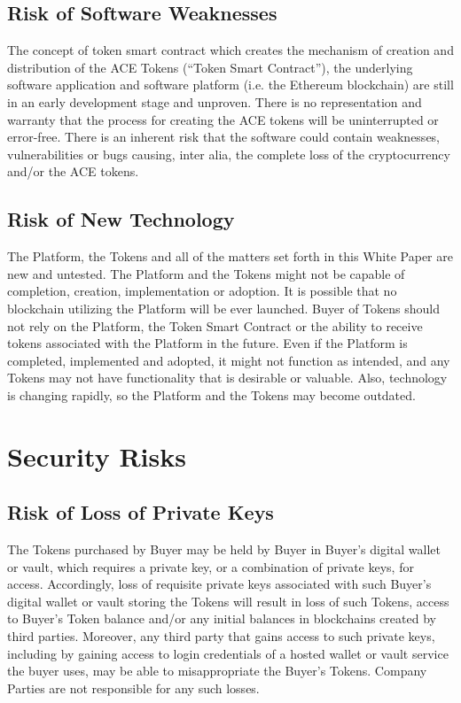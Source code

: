 \documentclass[12pt]{report}
\newcommand{\hlc}[1]{\colorbox{yellow!25}{#1}}
\begin{document}
\subsection*{\hlc{Risk of Software Weaknesses}}
\label{risks-block-weaknesses}
The concept of token smart contract which creates the mechanism of creation and distribution of the ACE Tokens (“Token Smart Contract”), the underlying software application and software platform (i.e. the Ethereum blockchain) are still in an early development stage and unproven. There is no representation and warranty that the process for creating the ACE tokens will be uninterrupted or error-free. There is an inherent risk that the software could contain weaknesses, vulnerabilities or bugs causing, inter alia, the complete loss of the cryptocurrency and/or the ACE
tokens.

\subsection*{Risk of New Technology}
The Platform, the Tokens and all of the matters set forth in this White Paper are new and untested. The Platform and the Tokens might not be capable of completion, creation, implementation or adoption. It is possible that no blockchain utilizing the Platform will be ever launched. Buyer of Tokens should not rely on the Platform,
the Token Smart Contract or the ability to receive tokens associated with the Platform in the future. Even if the Platform is completed, implemented and adopted, it might not function as intended, and any Tokens may not have functionality that is desirable or valuable. Also, technology is changing rapidly, so the Platform and the Tokens may become outdated.

\section{Security Risks}

\subsection*{Risk of Loss of Private Keys}
The Tokens purchased by Buyer may be held by Buyer in Buyer’s digital wallet or vault, which requires a private key, or a combination of private keys, for access. Accordingly, loss of requisite private keys associated with such Buyer’s digital wallet or vault storing the Tokens will result in loss of such Tokens, access to Buyer’s Token balance and/or any initial balances in blockchains created by third parties. Moreover, any third party that gains access to such private keys, including by gaining access to login credentials of a hosted wallet or vault service the buyer uses, may
be able to misappropriate the Buyer’s Tokens. Company Parties are not responsible for any such losses.
\end{document}
